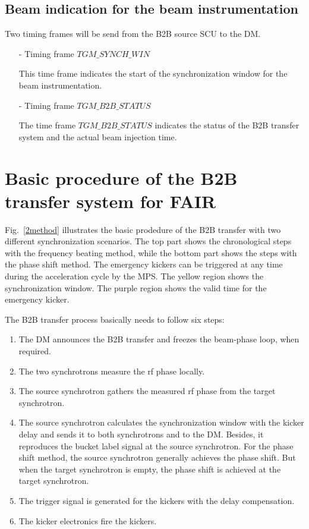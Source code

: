 \subsection{Beam indication for the beam instrumentation}

Two timing frames will be send from the B2B source SCU to the DM.
\begin{itemize}
\item[-] Timing frame $TGM\_SYNCH\_WIN$

This time frame indicates the start of the synchronization window for the beam instrumentation.

\item[-] Timing frame $TGM\_B2B\_STATUS$

The time frame $TGM\_B2B\_STATUS$ indicates the status of the B2B transfer system and the actual beam injection time. 
\end{itemize}

\section{Basic procedure of the B2B transfer system for FAIR}
Fig.~\ref{2method} illustrates the basic prodedure of the B2B transfer with two different synchronization scenarios. The top part shows the chronological steps with the frequency beating method, while the bottom part shows the steps with the phase shift method. The emergency kickers can be triggered at any time during the acceleration cycle by the MPS. The yellow region shows the synchronization window. The purple region shows the valid time for the emergency kicker. 

The B2B transfer process basically needs to follow six steps:
\begin{enumerate}
\item The DM announces the B2B transfer and freezes the beam-phase loop, when required.
\item The two synchrotrons measure the rf phase locally.
\item The source synchrotron gathers the measured rf phase from the target synchrotron.
\item The source synchrotron calculates the synchronization window with the kicker delay and sends it to both synchrotrons and to the DM. Besides, it reproduces the bucket label signal at the source synchrotron.
For the phase shift method, the source synchrotron generally achieves the phase shift. But when the target synchrotron is empty, the phase shift is achieved at the target synchrotron.
\item The trigger signal is generated for the kickers with the delay compensation.
\item The kicker electronics fire the kickers.
\end{enumerate}

